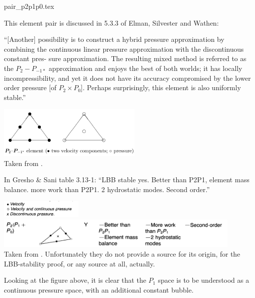 \begin{flushright} {\tiny {\color{gray} pair\_p2p1p0.tex}} \end{flushright}

This element pair is discussed in 5.3.3 of Elman, Silvester and Wathen: 

``[Another] possibility is to construct a hybrid pressure approximation by 
combining the continuous linear pressure approximation with the discontinuous constant pres-
sure approximation. The resulting mixed method is referred to as the $P_2-P_{-1*}$ 
approximation and enjoys the best of both worlds; it has locally 
incompressibility, and yet it does not have its accuracy compromised by
the lower order pressure [of $P_2\times P_0$]. 
Perhaps surprisingly, this element is also uniformly stable.'' 

\begin{center}
\includegraphics[width=7cm]{images/pair_p2p1p0/elsw}\\
{\captionfont Taken from \textcite{elsw}.}
\end{center}

In Gresho \& Sani table 3.13-1: ``LBB stable yes. Better than P2P1, element mass balance.
more work than P2P1. 2 hydrostatic modes. Second order.'' 

\begin{center}
\includegraphics[width=4cm]{images/pair_p2p1p0/grsa2}
\includegraphics[width=12cm]{images/pair_p2p1p0/grsa1}\\
{\captionfont Taken from \textcite{grsa}. Unfortunately they do not provide a source for 
its origin, for the LBB-stability proof, or any source at all, actually.}
\end{center}

Looking at the figure above, it is clear that the $P_1$ space is to be understood 
as a continuous pressure space, with an additional constant bubble. 

